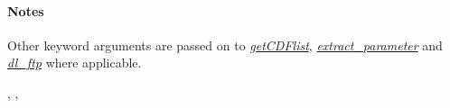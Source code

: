 \documentclass[letterpaper,10pt,english]{sphinxhowto}
\begin{document}
\begin{fulllineitems}
\begin{quote}
\begin{description}
\end{description}\end{quote}
\paragraph{Notes}

Other keyword arguments are passed on to {\hyperref[swtools_doc:getcdflist]{\emph{getCDFlist}}},
{\hyperref[swtools_doc:extract\string-parameter]{\emph{extract\_parameter}}} and {\hyperref[swtools_doc:dl\string-ftp]{\emph{dl\_ftp}}} where applicable.




{\hyperref[swtools_doc:swtools.getCDFlist]{\emph{}}}, {\hyperref[swtools_doc:swtools.extract_parameter]{\emph{}}}, {\hyperref[swtools_doc:swtools.dl_ftp]{\emph{}}}



\end{fulllineitems}

\end{document}

